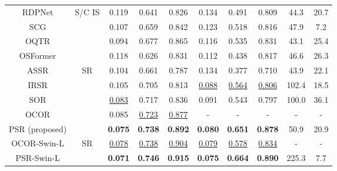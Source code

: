 \documentclass[sigconf]{acmart}
\begin{document}
\begin{table*}[t]
{{\begin{tabular}{c|c|c|c|c|c|c|c|c|c}
    \midrule
    RDPNet \cite{wu2021regularized}        & \multirow{4}{*}{S/C IS} & 0.119 & 0.641  & 0.826 & 0.134                &   0.491              & 0.809  & 44.3  & 20.7   \\
    SCG \cite{liu2021scg}           &                         & 0.107 & 0.659  & 0.842 & 0.123                &   0.518              & 0.816 & 47.9  & 7.2  \\
    OQTR \cite{pei2022transformer}          &                         & 0.094 & 0.677  & 0.865 & 0.116                &   0.535              & 0.831 & 43.1 & 25.4  \\
    OSFormer \cite{pei2022osformer}      &                         & 0.118 & 0.626  & 0.831 & 0.112                & 0.438                & 0.817 & 46.6 & 26.3 \\
    \midrule
    ASSR \cite{siris2020inferring}          & \multirow{5}{*}{SR}     & 0.104 & 0.661  & 0.787 & 0.134                & 0.377                & 0.710 & 43.9  & 22.1  \\
    IRSR \cite{liu2021instance}          &                         & 0.105 & 0.705  & 0.813 & \underline{0.088}                & \underline{0.564}                & \underline{0.806} & 102.4 & 18.5 \\
    SOR \cite{fang2021salient}           &                         & \underline{0.083} & 0.717  & 0.836 & 0.091                & 0.543                & 0.797 & 100.0  &  36.1  \\
    OCOR \cite{tian2022bi}    &                         & 0.085 & \underline{0.723}  & \underline{0.877} & -                    & -                    & -     & -     & -     \\
    PSR (proposed)           &                         & \textbf{0.075} & \textbf{0.738}  & \textbf{0.892} & \textbf{0.080}                & \textbf{0.651}                & \textbf{0.878} & 50.9  & 20.9  \\
    \midrule
    \midrule
    OCOR-Swin-L \cite{tian2022bi}   & \multirow{2}{*}{SR}     & \underline{0.078} & \underline{0.738}  & \underline{0.904} & \underline{0.079}                & \underline{0.578}                & \underline{0.834} & -     & -     \\
    PSR-Swin-L    &                         & \textbf{0.071} & \textbf{0.746}  & \textbf{0.915} & \textbf{0.075}                &   \textbf{0.664}              & \textbf{0.890}  & 225.3  & 7.7  \\
    \bottomrule[1pt]
    \end{tabular}
}
}
\end{table*}
\end{document}
